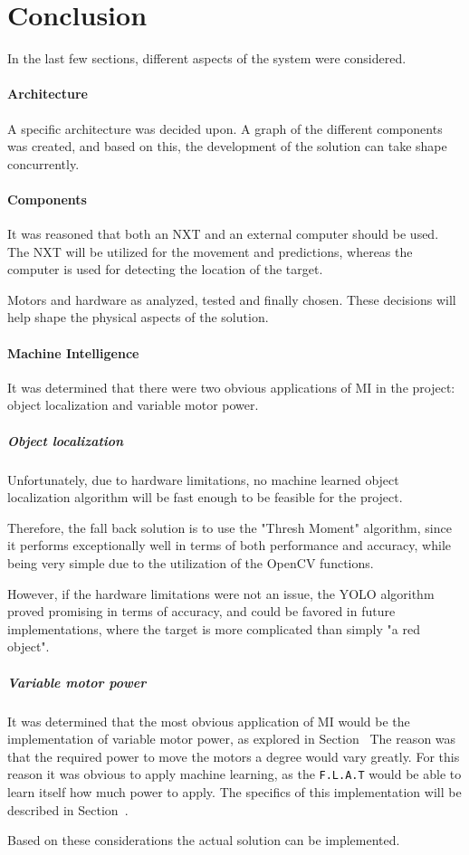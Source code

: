\section{Conclusion}
In the last few sections, different aspects of the system were considered.

\paragraph{Architecture}
A specific architecture was decided upon.
A graph of the different components was created, and based on this, the development of the solution can take shape concurrently.


\paragraph{Components}
It was reasoned that both an NXT and an external computer should be used.
The NXT will be utilized for the movement and predictions, whereas the computer is used for detecting the location of the target.


Motors and hardware as analyzed, tested and finally chosen.
These decisions will help shape the physical aspects of the solution.


\paragraph{Machine Intelligence}
It was determined that there were two obvious applications of MI in the project: object localization and variable motor power.

\subparagraph{Object localization}
Unfortunately, due to hardware limitations, no machine learned object localization algorithm will be fast enough to be feasible for the project.

Therefore, the fall back solution is to use the "Thresh Moment" algorithm, since it performs exceptionally well in terms of both performance and accuracy, while being very simple due to the utilization of the OpenCV functions.

However, if the hardware limitations were not an issue, the YOLO algorithm proved promising in terms of accuracy, and could be favored in future implementations, where the target is more complicated than simply "a red object".

\subparagraph{Variable motor power}
It was determined that the most obvious application of MI would be the implementation of variable motor power, as explored in Section~
The reason was that the required power to move the motors a degree would vary greatly.
For this reason it was obvious to apply machine learning, as the \texttt{F.L.A.T} would be able to learn itself how much power to apply.
The specifics of this implementation will be described in Section~.


Based on these considerations the actual solution can be implemented.
